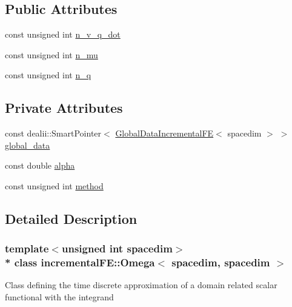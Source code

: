 \subsection*{Public Attributes}
\begin{DoxyCompactItemize}
\item 
const unsigned int \hyperlink{classincremental_f_e_1_1_omega_3_01spacedim_00_01spacedim_01_4_ae34ad644385b50d04d1b04e42c8a5b28}{n\+\_\+v\+\_\+q\+\_\+dot}
\item 
const unsigned int \hyperlink{classincremental_f_e_1_1_omega_3_01spacedim_00_01spacedim_01_4_a7f1db416dd6b487504856959c7253b53}{n\+\_\+mu}
\item 
const unsigned int \hyperlink{classincremental_f_e_1_1_omega_3_01spacedim_00_01spacedim_01_4_a708fdb9951f4879eaa020219f19db115}{n\+\_\+q}
\end{DoxyCompactItemize}
\subsection*{Private Attributes}
\begin{DoxyCompactItemize}
\item 
const dealii\+::\+Smart\+Pointer$<$ \hyperlink{classincremental_f_e_1_1_global_data_incremental_f_e}{Global\+Data\+Incremental\+FE}$<$ spacedim $>$ $>$ \hyperlink{classincremental_f_e_1_1_omega_3_01spacedim_00_01spacedim_01_4_afffe781a5a2032ec003032adc78e1bf3}{global\+\_\+data}
\item 
const double \hyperlink{classincremental_f_e_1_1_omega_3_01spacedim_00_01spacedim_01_4_ad881c36804cc027c301f4f069756c2db}{alpha}
\item 
const unsigned int \hyperlink{classincremental_f_e_1_1_omega_3_01spacedim_00_01spacedim_01_4_a6c95d57122261e8a2e26d3818251bc9b}{method}
\end{DoxyCompactItemize}


\subsection{Detailed Description}
\subsubsection*{template$<$unsigned int spacedim$>$\\*
class incremental\+F\+E\+::\+Omega$<$ spacedim, spacedim $>$}

Class defining the time discrete approximation of a domain related scalar functional with the integrand

